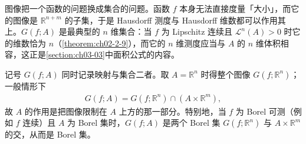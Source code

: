 \documentclass[../../main.tex]{subfiles}%
\begin{document}
\begin{remark}\label{remark:ch02-def-2-5-动机}
图像把一个函数的问题换成集合的问题。函数 $f$ 本身无法直接度量「大小」，而它的图像是 $\mathbb{R}^{n+m}$ 的子集，于是 Hausdorff 测度与 Hausdorff 维数都可以作用其上。$G(f;A)$ 是最典型的 $n$ 维集合：当 $f$ 为 Lipschitz 连续且 $\mathcal{L}^n(A)>0$ 时它的维数恰为 $n$（\cref{theorem:ch02-2-9}），而它的 $n$ 维测度应当与 $A$ 的 $n$ 维体积相容，这正是\cref{section:ch03-03}中面积公式的内容。%

记号 $G(f;A)$ 同时记录映射与集合二者。取 $A=\mathbb{R}^n$ 时得整个图像 $G(f;\mathbb{R}^n)$；一般情形下
\begin{align*}
G(f;A)=G(f;\mathbb{R}^n)\cap(A\times\mathbb{R}^m),
\end{align*}
故 $A$ 的作用是把图像限制在 $A$ 上方的那一部分。特别地，当 $f$ 为 Borel 可测（例如 $f$ 连续）且 $A$ 为 Borel 集时，$G(f;A)$ 是两个 Borel 集 $G(f;\mathbb{R}^n)$ 与 $A\times\mathbb{R}^m$ 的交，从而是 Borel 集。
\end{remark}
\end{document}
